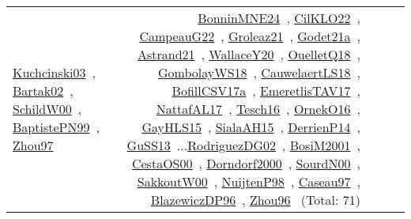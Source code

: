 {\begin{longtable}{p{3cm}r>{\raggedright\arraybackslash}p{6cm}>{\raggedright\arraybackslash}p{6cm}>{\raggedright\arraybackslash}p{8cm}}
\href{../works/Kuchcinski03.pdf}{Kuchcinski03}~\cite{Kuchcinski03}, \href{../works/Bartak02.pdf}{Bartak02}~\cite{Bartak02}, \href{../works/SchildW00.pdf}{SchildW00}~\cite{SchildW00}, \href{../works/BaptistePN99.pdf}{BaptistePN99}~\cite{BaptistePN99}, \href{../works/Zhou97.pdf}{Zhou97}~\cite{Zhou97} & \href{../works/BonninMNE24.pdf}{BonninMNE24}~\cite{BonninMNE24}, \href{../works/CilKLO22.pdf}{CilKLO22}~\cite{CilKLO22}, \href{../works/CampeauG22.pdf}{CampeauG22}~\cite{CampeauG22}, \href{../works/Groleaz21.pdf}{Groleaz21}~\cite{Groleaz21}, \href{../works/Godet21a.pdf}{Godet21a}~\cite{Godet21a}, \href{../works/Astrand21.pdf}{Astrand21}~\cite{Astrand21}, \href{../works/WallaceY20.pdf}{WallaceY20}~\cite{WallaceY20}, \href{../works/OuelletQ18.pdf}{OuelletQ18}~\cite{OuelletQ18}, \href{../works/GombolayWS18.pdf}{GombolayWS18}~\cite{GombolayWS18}, \href{../works/CauwelaertLS18.pdf}{CauwelaertLS18}~\cite{CauwelaertLS18}, \href{../works/BofillCSV17a.pdf}{BofillCSV17a}~\cite{BofillCSV17a}, \href{../works/EmeretlisTAV17.pdf}{EmeretlisTAV17}~\cite{EmeretlisTAV17}, \href{../works/NattafAL17.pdf}{NattafAL17}~\cite{NattafAL17}, \href{../works/Tesch16.pdf}{Tesch16}~\cite{Tesch16}, \href{../works/OrnekO16.pdf}{OrnekO16}~\cite{OrnekO16}, \href{../works/GayHLS15.pdf}{GayHLS15}~\cite{GayHLS15}, \href{../works/SialaAH15.pdf}{SialaAH15}~\cite{SialaAH15}, \href{../works/DerrienP14.pdf}{DerrienP14}~\cite{DerrienP14}, \href{../works/GuSS13.pdf}{GuSS13}~\cite{GuSS13}...\href{../works/RodriguezDG02.pdf}{RodriguezDG02}~\cite{RodriguezDG02}, \href{../works/BosiM2001.pdf}{BosiM2001}~\cite{BosiM2001}, \href{../works/CestaOS00.pdf}{CestaOS00}~\cite{CestaOS00}, \href{../works/Dorndorf2000.pdf}{Dorndorf2000}~\cite{Dorndorf2000}, \href{../works/SourdN00.pdf}{SourdN00}~\cite{SourdN00}, \href{../works/SakkoutW00.pdf}{SakkoutW00}~\cite{SakkoutW00}, \href{../works/NuijtenP98.pdf}{NuijtenP98}~\cite{NuijtenP98}, \href{../works/Caseau97.pdf}{Caseau97}~\cite{Caseau97}, \href{../works/BlazewiczDP96.pdf}{BlazewiczDP96}~\cite{BlazewiczDP96}, \href{../works/Zhou96.pdf}{Zhou96}~\cite{Zhou96} (Total: 71)\\

\end{longtable}}
